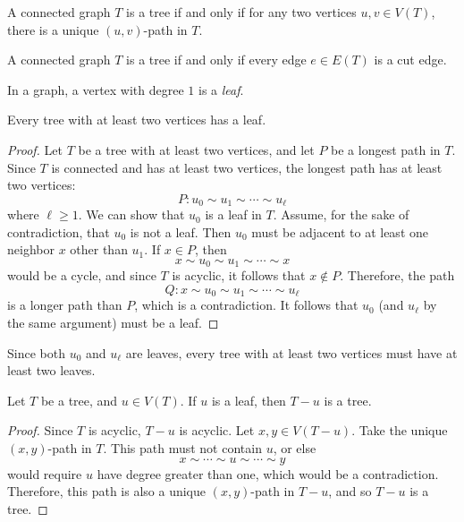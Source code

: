 \begin{thm}\label{tree-unique-path}
    A connected graph $T$ is a tree if and only if for any two vertices $u, v \in V(T)$, there is a unique $(u, v)$-path in $T$.
\end{thm}

\begin{thm}\label{tree-cute-edges}
    A connected graph $T$ is a tree if and only if every edge $e \in E(T)$ is a cut edge.
\end{thm}

\begin{defn}
    In a graph, a vertex with degree $1$ is a \emph{leaf}.
\end{defn}

\begin{thm}\label{tree-has-leaf}
    Every tree with at least two vertices has a leaf.
\end{thm}

\begin{proof}
    Let $T$ be a tree with at least two vertices, and let $P$ be a longest path in $T$. Since $T$ is connected and has at least two vertices, the longest path has at least two vertices:
    \[P: u_0 \sim u_1 \sim \cdots \sim u_{\ell}\] where $\ell \geq 1$. We can show that $u_0$ is a leaf in $T$. Assume, for the sake of contradiction, that $u_0$ is not a leaf. Then $u_0$ must be adjacent to at least one neighbor $x$ other than $u_1$. If $x \in P$, then
    \[x \sim u_0 \sim u_1 \sim \cdots \sim x\] would be a cycle, and since $T$ is acyclic, it follows that $x \notin P$. Therefore, the path
    \[Q: x \sim u_0 \sim u_1 \sim \cdots \sim u_{\ell}\] is a longer path than $P$, which is a contradiction. It follows that $u_0$ (and $u_{\ell}$ by the same argument) must be a leaf.
\end{proof}

\begin{rmk}
    Since both $u_0$ and $u_{\ell}$ are leaves, every tree with at least two vertices must have at least two leaves.
\end{rmk}

\begin{prop}\label{tree-minus-leaf}
    Let $T$ be a tree, and $u \in V(T)$. If $u$ is a leaf, then $T - u$ is a tree.
\end{prop}

\begin{proof}
    Since $T$ is acyclic, $T - u$ is acyclic. Let $x, y \in V(T - u)$. Take the unique $(x, y)$-path in $T$. This path must not contain $u$, or else
    \[x \sim \cdots \sim u \sim \cdots \sim y\] would require $u$ have degree greater than one, which would be a contradiction. Therefore, this path is also a unique $(x, y)$-path in $T - u$, and so $T - u$ is a tree.
\end{proof}

